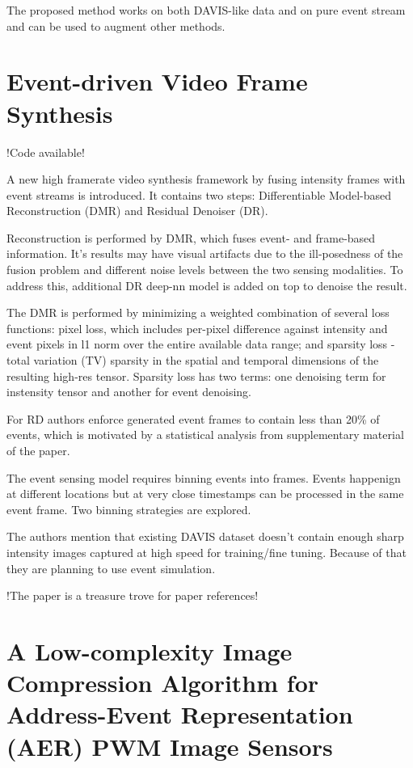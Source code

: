 \documentclass[10pt,a4paper]{article}
\begin{document}
The proposed method works on both DAVIS-like data and on pure event stream and can be used to augment other methods.

\section{Event-driven Video Frame Synthesis}
!Code available!

A new high framerate video synthesis framework by fusing intensity frames with event streams is introduced.
It contains two steps: Differentiable Model-based Reconstruction (DMR) and Residual Denoiser (DR).

Reconstruction is performed by DMR, which fuses event- and frame-based information. 
It's results may have visual artifacts due to the ill-posedness of the fusion problem and different noise levels between the two sensing modalities.
To address this, additional DR deep-nn model is added on top to denoise the result.

The DMR is performed by minimizing a weighted combination of several loss functions: 
pixel loss, which includes per-pixel difference against intensity and event pixels in l1 norm over the entire available data range;
and sparsity loss - total variation (TV) sparsity in the spatial and temporal dimensions of the resulting high-res tensor.
Sparsity loss has two terms: one denoising term for instensity tensor and another for event denoising.

For RD authors enforce generated event frames to contain less than 20\% of events, which is motivated by a statistical analysis from supplementary material of the paper.

The event sensing model requires binning events into frames. 
Events happenign at different locations but at very close timestamps can be processed in the same event frame.
Two binning strategies are explored.

The authors mention that existing DAVIS dataset doesn't contain enough sharp intensity images captured at high speed for training/fine tuning. 
Because of that they are planning to use event simulation.

!The paper is a  treasure trove for paper references!

\section{A Low-complexity Image Compression Algorithm for Address-Event Representation (AER) PWM Image Sensors}
\end{document}
